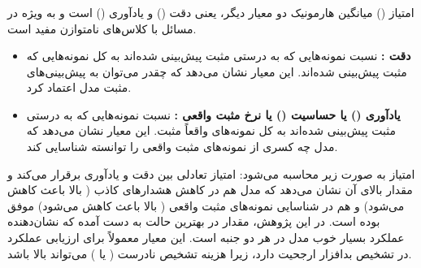 \subsubsection{}
امتیاز  () میانگین هارمونیک دو معیار دیگر، یعنی دقت () و یادآوری () است و به ویژه در مسائل با کلاس‌های نامتوازن مفید است.
\begin{itemize}
    \renewcommand{\labelitemi}{\lr{$\bullet$}}
    \item \textbf{دقت :} نسبت نمونه‌هایی که به درستی مثبت پیش‌بینی شده‌اند به کل نمونه‌هایی که مثبت پیش‌بینی شده‌اند. این معیار نشان می‌دهد که چقدر می‌توان به پیش‌بینی‌های مثبت مدل اعتماد کرد.
    \lr{\[ \text{Precision} = \frac{\text{TP}}{\text{TP} + \text{FP}} \]}
    \item \textbf{یادآوری () یا حساسیت () یا نرخ مثبت واقعی :} نسبت نمونه‌هایی که به درستی مثبت پیش‌بینی شده‌اند به کل نمونه‌های واقعاً مثبت. این معیار نشان می‌دهد که مدل چه کسری از نمونه‌های مثبت واقعی را توانسته شناسایی کند.
    \lr{\[ \text{Recall} = \frac{\text{TP}}{\text{TP} + \text{FN}} \]}
\end{itemize}
امتیاز  به صورت زیر محاسبه می‌شود:
\lr{\[ \text{F1 Score} = 2 \times \frac{\text{Precision} \times \text{Recall}}{\text{Precision} + \text{Recall}} = \frac{2 \times \text{TP}}{2 \times \text{TP} + \text{FP} + \text{FN}} \]}
امتیاز  تعادلی بین دقت و یادآوری برقرار می‌کند و مقدار بالای آن نشان می‌دهد که مدل هم در کاهش هشدارهای کاذب ( بالا باعث کاهش  می‌شود) و هم در شناسایی نمونه‌های مثبت واقعی ( بالا باعث کاهش  می‌شود) موفق بوده است. در این پژوهش، مقدار   در بهترین حالت به دست آمده که نشان‌دهنده عملکرد بسیار خوب مدل در هر دو جنبه است. این معیار معمولاً برای ارزیابی عملکرد در تشخیص بدافزار ارجحیت دارد، زیرا هزینه تشخیص نادرست ( یا ) می‌تواند بالا باشد.

